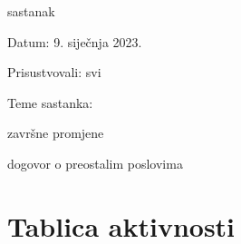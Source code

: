 \begin{packed_enum}
			\item  sastanak
			\item[] \begin{packed_item}
				\item Datum: 9. siječnja 2023.
				\item Prisustvovali: svi
				\item Teme sastanka:
				\begin{packed_item}
					\item  završne promjene
					\item  dogovor o preostalim poslovima 
				\end{packed_item}
			\end{packed_item}
			
		\end{packed_enum}
		
		\eject
		\section*{Tablica aktivnosti}
		

